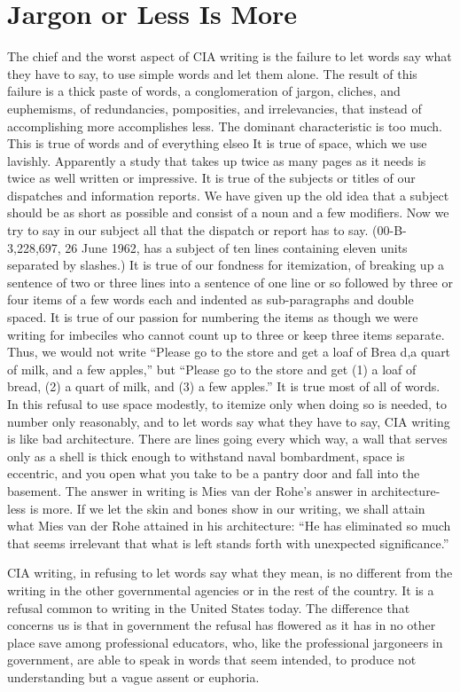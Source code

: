 \documentclass[
    oneside,
    11pt,
]{memoir}
\begin{document}
\chapter{Jargon or Less Is More}
The chief and the worst aspect of CIA writing is the failure to let words say what they have to say, to use simple words and let them alone. The result of this failure is a thick paste of words, a conglomeration of jargon, cliches, and euphemisms, of redundancies, pomposities, and irrelevancies, that instead of accomplishing more accomplishes less. The dominant characteristic is too much. This is true of words and of everything elseo It is true of space, which we use lavishly. Apparently a study that takes up twice as many pages as it needs is twice as well written or impressive. It is true of the subjects or titles of our dispatches and information reports. We have given up the old idea that a subject should be as short as possible and consist of a noun and a few modifiers. Now we try to say in our subject all that the dispatch or report has to say. (00-B-3,228,697, 26 June 1962, has a subject of ten lines containing eleven units separated by slashes.) It is true of our fondness for itemization, of breaking up a sentence of two or three lines into a sentence of one line or so followed by three or four items of a few words each and indented as sub-paragraphs and double spaced. It is true of our passion for numbering the items as though we were writing for imbeciles who cannot count up to three or keep three items separate. Thus, we would not write \enquote{Please go to the store and get a loaf of Brea d,a quart of milk, and a few apples,} but \enquote{Please go to the store and get (1) a loaf of bread, (2) a quart of milk, and (3) a few apples.} It is true most of all of words. In this refusal to use space modestly, to itemize only when doing so is needed, to number only reasonably, and to let words say what they have to say, CIA writing is like bad architecture. There are lines going every which way, a wall that serves only as a shell is thick enough to withstand naval bombardment, space is eccentric, and you open what you take to be a pantry door and fall into the basement. The answer in writing is Mies van der Rohe's answer in architecture-less is more. If we let the skin and bones show in our writing, we shall attain what Mies van der Rohe attained in his architecture: \enquote{He has eliminated so much that seems irrelevant that what is left stands forth with unexpected significance.}

CIA writing, in refusing to let words say what they mean, is no different from the writing in the other governmental agencies or in the rest of the country. It is a refusal common to writing in the United States today. The difference that concerns us is that in government the refusal has flowered as it has in no other place save among professional educators, who, like the professional jargoneers in government, are able to speak in words that seem intended, to produce not understanding but a vague assent or euphoria.
\end{document}
